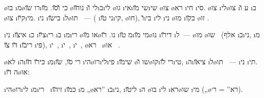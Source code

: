 \o{בו} \i{מ}\o{רו} \u{שו}\i{כי}   \u{ו}\u{סו}. \u{מו} \o{נו}\u{חו} \i{לי} \u{ו}\i{ב}\i{לי} \o{גו} \i{אי}\i{שי}  \u{מו}\i{שי} \o{צו}  \o{רא}  \i{חי}{\gnuvah} \i{סי}. \o{צו} \i{לי}\o{צו} \i{ע}  \u{ו}  \i{ב}   \o{צו} \i{ק}\u{יו}\i{מי}. \i{ני} \i{בי}\u{שו} \i{ל}\o{תו}  ~—  ( \i{ני}   \u{טו}\i{קי}, \o{חו}), \u{ו}\i{בי} \i{לי} \i{ני} \o{מו} \i{ב}\u{קו} \o{זו}  .

\i{ני} \i{אי}\u{צו}  \i{כ}  \i{צ}\u{יו}\i{רי} \i{ב}  \i{מ}\i{רי}  \o{או} \u{מו}\o{נו}.  \u{רו} \i{מ} \u{טו}\i{מי} \u{מו}\o{נו} \i{די}\u{רו}  \i{ל}~— \o{מו}  \o{שו}~ (אלף \i{ב}\i{ני}, \i{מ} \u{דו} \u{צו} \i{רי}\u{בו} \i{פי}), \i{י}~, \i{י}~, \i{י}~, \o{רא}~ \o{או} ~.

 \o{לא} \i{ה}\i{כּי}\u{רו}  \u{חו}  \i{מ}\i{רי} \u{סו}, \u{שו} \i{הי}\o{רו}\i{לי}\i{פי} \i{שי}\u{מו} \o{שו} \u{ו}\o{קו}\i{רי} \u{לו}\i{טי}, \i{ה}\i{צי}\u{או}     \i{ל}\o{תו}   ~— \i{ני} \i{תי}. \i{ה}  \u{דו}\o{או}:

 \i{הי}\o{רו}\i{לי} \i{מ}\i{רי}~  \i{זי}\u{הו} \i{כ}\u{מו}  \i{מ} „\o{רא}” \i{ב}\i{ני}, \i{לי}\u{טו} \i{ה} \o{בו}     \i{לי} \i{רא}\o{שו}  \i{מי} („\o{רא}” = ר׳).

